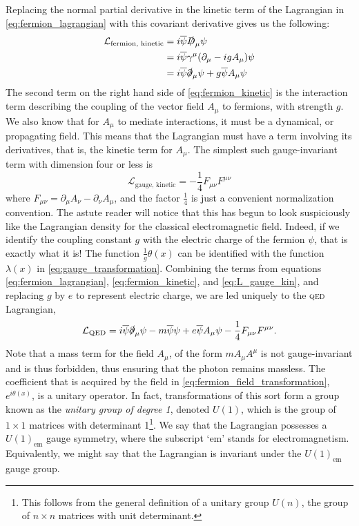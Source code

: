 Replacing the normal partial derivative in the kinetic term of the Lagrangian in \autoref{eq:fermion_lagrangian} with this covariant derivative gives us the following: 
\begin{equation}\label{eq:fermion_kinetic}
    \begin{split}
  \mathcal{L}_\text{fermion, kinetic} &= i\overline{\psi}\slashed{D}_\mu\psi\\
&= i\overline{\psi}\gamma^\mu(\partial_\mu-igA_\mu)\psi\\
&= i\overline{\psi}\slashed{\partial}_\mu\psi + g\overline{\psi}A_\mu\psi
\end{split}
\end{equation}
The second term on the right hand side of \autoref{eq:fermion_kinetic} is the interaction term describing the coupling of the vector field $A_\mu$ to fermions, with strength $g$. We also know that for $A_\mu$ to mediate interactions, it must be a dynamical, or propagating field. This means that the Lagrangian must have a term involving its derivatives, that is, the kinetic term for $A_\mu$. The simplest such gauge-invariant term with dimension four or less is %
%
\begin{equation}\label{eq:L_gauge_kin}
\mathcal{L}_\text{gauge, kinetic} = -\frac{1}{4}F_{\mu\nu}F^{\mu\nu}
\end{equation}
%
where $F_{\mu\nu} = \partial_\mu A_\nu - \partial_\nu A_\mu$, and the factor $\frac{1}{4}$ is just a convenient normalization convention. The astute reader will notice that this has begun to look suspiciously like the Lagrangian density for the classical electromagnetic field. Indeed, if we identify the coupling constant $g$ with the electric charge of the fermion $\psi$, that is exactly what it is! The function $\frac{1}{g} \theta(x)$ can be identified with the function $\lambda(x)$ in \autoref{eq:gauge_transformation}. Combining the terms from equations \ref{eq:fermion_lagrangian}, \ref{eq:fermion_kinetic}, and \ref{eq:L_gauge_kin}, and replacing $g$ by $e$ to represent electric charge, we are led uniquely to the \textsc{qed} Lagrangian,
\begin{equation}
  \mathcal{L}_\text{QED} = i\overline{\psi}\slashed{\partial}_\mu\psi - m\overline{\psi}\psi + e\overline{\psi}A_\mu\psi -\frac{1}{4}F_{\mu\nu}F^{\mu\nu}.
\end{equation}
Note that a mass term for the field $A_\mu$, of the form $mA_\mu A^\mu$ is not gauge-invariant and is thus forbidden, thus ensuring that the photon remains massless.
The coefficient that is acquired by the field in \autoref{eq:fermion_field_transformation}, $e^{i\theta(x)}$, is a unitary operator. In fact, transformations of this sort form a group known as the \emph{unitary group of degree 1}, denoted $U(1)$, which is the group of $1\times 1$ matrices with determinant 1\footnote{This follows from the general definition of a unitary group $U(n)$, the group of $n\times n$ matrices with unit determinant.}. We say that the Lagrangian possesses a $U(1)_\text{em}$ gauge symmetry, where the subscript `em' stands for electromagnetism. Equivalently, we might say that the Lagrangian is invariant under the $U(1)_\text{em}$ gauge group. 

